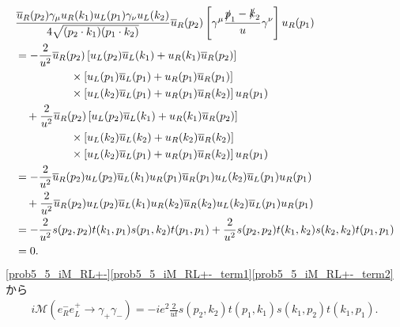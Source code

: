 \begin{align}
  \begin{split}
    & \frac{\overline{u}_R(p_2)\gamma_\mu u_R(k_1) u_L(p_1)\gamma_\nu u_L(k_2)}{4\sqrt{(p_2 \cdot k_1)(p_1 \cdot k_2)}} \overline{u}_R(p_2)
    \left[ \gamma^\mu \frac{\slashed{p}_1 - \slashed{k}_2}{u} \gamma^\nu \right] u_R(p_1) \\
    &= -\frac{2}{u^2} \overline{u}_R(p_2) \left[ u_L(p_2)\overline{u}_L(k_1) + u_R(k_1)\overline{u}_R(p_2) \right] \\
    &\qquad\qquad\quad\times \left[ u_L(p_1)\overline{u}_L(p_1) + u_R(p_1)\overline{u}_R(p_1) \right] \\
    &\qquad\qquad\quad\times \left[ u_L(k_2)\overline{u}_L(p_1) + u_R(p_1)\overline{u}_R(k_2) \right] u_R(p_1) \\
    &\quad +\frac{2}{u^2} \overline{u}_R(p_2) \left[ u_L(p_2)\overline{u}_L(k_1) + u_R(k_1)\overline{u}_R(p_2) \right] \\
    &\qquad\qquad\quad\times \left[ u_L(k_2)\overline{u}_L(k_2) + u_R(k_2)\overline{u}_R(k_2) \right] \\
    &\qquad\qquad\quad\times \left[ u_L(k_2)\overline{u}_L(p_1) + u_R(p_1)\overline{u}_R(k_2) \right] u_R(p_1) \\
    &= -\frac{2}{u^2} \overline{u}_R(p_2) u_L(p_2)\overline{u}_L(k_1) u_R(p_1)\overline{u}_R(p_1) u_L(k_2)\overline{u}_L(p_1) u_R(p_1) \\
    &\quad +\frac{2}{u^2} \overline{u}_R(p_2) u_L(p_2)\overline{u}_L(k_1) u_R(k_2)\overline{u}_R(k_2) u_L(k_2)\overline{u}_L(p_1) u_R(p_1) \\
    &= -\frac{2}{u^2} s(p_2, p_2) t(k_1, p_1) s(p_1, k_2) t(p_1, p_1) + \frac{2}{u^2} s(p_2, p_2) t(k_1, k_2) s(k_2, k_2) t(p_1, p_1) \\
    &= 0 .
  \end{split}
  \label{prob5_5_iM_RL+-_term2}
\end{align}
\eqref{prob5_5_iM_RL+-}\eqref{prob5_5_iM_RL+-_term1}\eqref{prob5_5_iM_RL+-_term2}から
\begin{align}
  i\mathcal{M}(e^-_R e^+_L \to \gamma_+\gamma_-) = -ie^2 \frac{2}{ut} s(p_2, k_2) t(p_1, k_1) s(k_1, p_2) t(k_1, p_1) . \label{prob5_5_iM_RL+-_cal}
\end{align}

